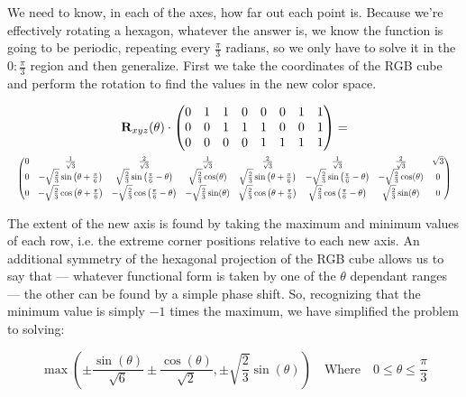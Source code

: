 We need to know, in each of the axes, how far out each point is. Because we're effectively rotating a hexagon, whatever the answer is, we know the function is going to be periodic, repeating every $\frac{\pi}{3}$ radians, so we only have to solve it in the $0:\frac{\pi}{3}$ region and then generalize. First we take the coordinates of the RGB cube and perform the rotation to find the values in the new color space.


\begin{multline}\label{eq:YabCube}
  \R_{xyz}(\theta)\cdot
\begin{pmatrix}
 0 & 1 & 1 & 0 & 0 & 0 & 1 & 1 \\
 0 & 0 & 1 & 1 & 1 & 0 & 0 & 1 \\
 0 & 0 & 0 & 0 & 1 & 1 & 1 & 1 \\
\end{pmatrix}
 = \\
\resizebox{\textwidth}{!}{%
$\displaystyle
\begin{pmatrix}
 0 & \frac{1}{\sqrt{3}} & \frac{2}{\sqrt{3}} & \frac{1}{\sqrt{3}} & \frac{2}{\sqrt{3}} & \frac{1}{\sqrt{3}} & \frac{2}{\sqrt{3}} & \sqrt{3} \\
 0 & -\sqrt{\frac{2}{3}} \sin \left(\theta +\Pii{6}\right) & \sqrt{\frac{2}{3}} \sin \left(\Pii{6}-\theta \right) & \sqrt{\frac{2}{3}} \cos (\theta ) & \sqrt{\frac{2}{3}} \sin \left(\theta +\Pii{6}\right) & -\sqrt{\frac{2}{3}} \sin \left(\Pii{6}-\theta \right) & -\sqrt{\frac{2}{3}} \cos (\theta ) & 0 \\
 0 & -\sqrt{\frac{2}{3}} \cos \left(\theta +\Pii{6}\right) & -\sqrt{\frac{2}{3}} \cos \left(\Pii{6}-\theta \right) & -\sqrt{\frac{2}{3}} \sin (\theta ) & \sqrt{\frac{2}{3}} \cos \left(\theta +\Pii{6}\right) & \sqrt{\frac{2}{3}} \cos \left(\Pii{6}-\theta \right) & \sqrt{\frac{2}{3}} \sin (\theta ) & 0 \\
\end{pmatrix}$}
\end{multline}


The extent of the new axis is found by taking the maximum and minimum values of each row, i.e. the extreme corner positions relative to each new axis. An additional symmetry of the hexagonal projection of the RGB cube allows us to say that --- whatever functional form is taken by one of the $\theta$ dependant ranges --- the other can be found by a simple phase shift. So, recognizing that the minimum value is simply $-1$ times the maximum, we have simplified the problem to solving:

\begin{equation}\label{eq:AxisRangeMinMax}
 \max\left(\pm\frac{\sin (\theta )}{\sqrt{6}}\pm\frac{\cos (\theta )}{\sqrt{2}}, \pm\sqrt{\frac{2}{3}} \sin (\theta ) \right) \quad \text{Where} \quad 0\leq \theta \leq \frac{\pi}{3}
\end{equation}


